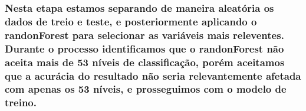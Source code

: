 \documentclass[]{article}
\begin{document}
\subsubsection{Nesta etapa estamos separando de maneira aleatória os
dados de treio e teste, e posteriormente aplicando o randonForest para
selecionar as variáveis mais releventes. Durante o processo
identificamos que o randonForest não aceita mais de 53 níveis de
classificação, porém aceitamos que a acurácia do resultado não seria
relevantemente afetada com apenas os 53 níveis, e prosseguimos com o
modelo de
treino.}\label{nesta-etapa-estamos-separando-de-maneira-aleatoria-os-dados-de-treio-e-teste-e-posteriormente-aplicando-o-randonforest-para-selecionar-as-variaveis-mais-releventes.-durante-o-processo-identificamos-que-o-randonforest-nao-aceita-mais-de-53-niveis-de-classificacao-porem-aceitamos-que-a-acuracia-do-resultado-nao-seria-relevantemente-afetada-com-apenas-os-53-niveis-e-prosseguimos-com-o-modelo-de-treino.}
\end{document}
